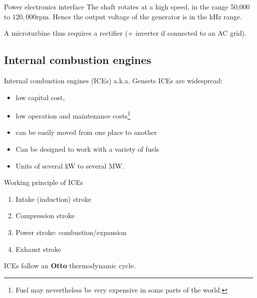 \begin{frame}{Power electronics interface}
The shaft rotates at a high speed, in the range 50,000 to $120,000 \mathrm{rpm}$. Hence the output voltage of the generator is in the kHz range.

A microturbine thus requires a rectifier (+ inverter if connected to an AC grid).

\end{frame}


\subsection{Internal combustion engines}
\begin{frame}{Internal combustion engines (ICEs) a.k.a. Gensets}
ICEs are widespread:

\begin{itemize}
  \item low capital cost,
  \item low operation and maintenance costs\footnote{Fuel may nevertheless be very expensive in some parts of the world.}
  \item can be easily moved from one place to another
  \item Can be designed to work with a variety of fuels
  \item Units of several kW to several MW.
\end{itemize}

\end{frame}\begin{frame}{Working principle of ICEs}
\begin{enumerate}
  \item Intake (induction) stroke
  \item Compression stroke
  \item Power stroke: combustion/expansion
  \item Exhaust stroke
\end{enumerate}

ICEs follow an \textbf{Otto} thermodynamic cycle.
\end{frame}
